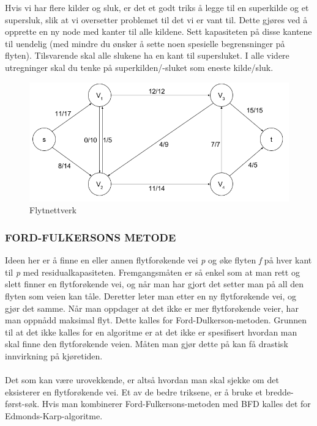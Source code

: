 \noindent Hvis vi har flere kilder og sluk, er det et godt triks å legge til en superkilde og et supersluk, slik at vi oversetter problemet til det vi er vant til. Dette gjøres ved å opprette en ny node med kanter til alle kildene. Sett kapasiteten på disse kantene til uendelig (med mindre du ønsker å sette noen spesielle begrensninger på flyten). Tilsvarende skal alle slukene ha en kant til supersluket. I alle videre utregninger skal du tenke på superkilden/-sluket som eneste kilde/sluk.

\begin{figure}[H]
\includegraphics[scale=0.6]{images/flytnettverk}
\centering %
\caption{Flytnettverk}
\label{fig:flytnettverk}
\end{figure}

\subsubsection{FORD-FULKERSONS METODE}
Ideen her er å finne en eller annen flytforøkende vei \textit{p} og øke flyten \textit{f} på hver kant til \textit{p} med residualkapasiteten. Fremgangsmåten er så enkel som at man rett og slett finner en flytforøkende vei, og når man har gjort det setter man på all den flyten som veien kan tåle. Deretter leter man etter en ny flytforøkende vei, og gjør det samme. Når man oppdager at det ikke er mer flytforøkende veier, har man oppnådd maksimal flyt. Dette kalles for Ford-Dulkerson-metoden. Grunnen til at det ikke kalles for en algoritme er at det ikke er spesifisert hvordan man skal finne den flytforøkende veien. Måten man gjør dette på kan få drastisk innvirkning på kjøretiden.
\\\\
Det som kan være urovekkende, er altså hvordan man skal sjekke om det eksisterer en flytforøkende vei. Et av de bedre triksene, er å bruke et bredde-først-søk. Hvis man kombinerer Ford-Fulkersons-metoden med BFD kalles det for Edmonds-Karp-algoritme.


